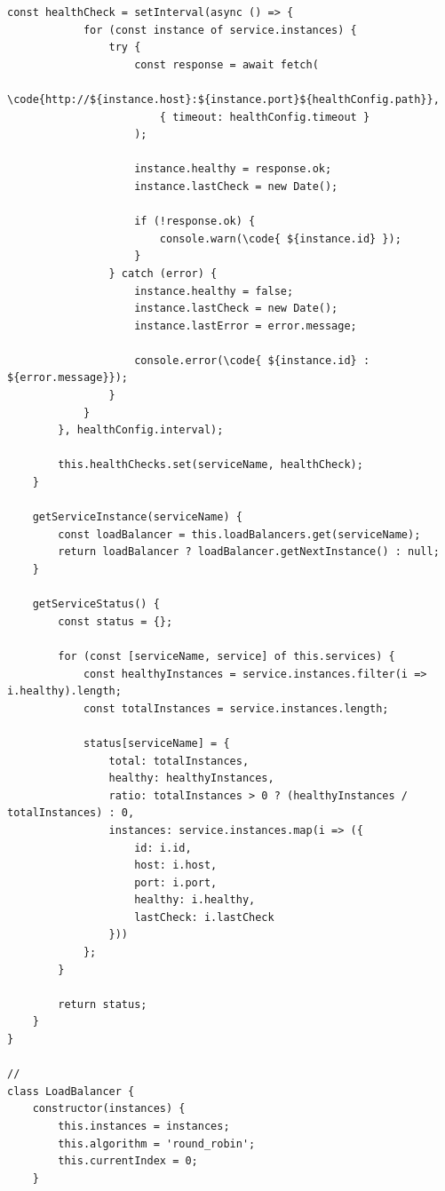 \begin{lstlisting}[style=javascript]
        const healthCheck = setInterval(async () => {
            for (const instance of service.instances) {
                try {
                    const response = await fetch(
                        \code{http://${instance.host}:${instance.port}${healthConfig.path}},
                        { timeout: healthConfig.timeout }
                    );
                    
                    instance.healthy = response.ok;
                    instance.lastCheck = new Date();
                    
                    if (!response.ok) {
                        console.warn(\code{ ${instance.id} });
                    }
                } catch (error) {
                    instance.healthy = false;
                    instance.lastCheck = new Date();
                    instance.lastError = error.message;
                    
                    console.error(\code{ ${instance.id} : ${error.message}});
                }
            }
        }, healthConfig.interval);
        
        this.healthChecks.set(serviceName, healthCheck);
    }
    
    getServiceInstance(serviceName) {
        const loadBalancer = this.loadBalancers.get(serviceName);
        return loadBalancer ? loadBalancer.getNextInstance() : null;
    }
    
    getServiceStatus() {
        const status = {};
        
        for (const [serviceName, service] of this.services) {
            const healthyInstances = service.instances.filter(i => i.healthy).length;
            const totalInstances = service.instances.length;
            
            status[serviceName] = {
                total: totalInstances,
                healthy: healthyInstances,
                ratio: totalInstances > 0 ? (healthyInstances / totalInstances) : 0,
                instances: service.instances.map(i => ({
                    id: i.id,
                    host: i.host,
                    port: i.port,
                    healthy: i.healthy,
                    lastCheck: i.lastCheck
                }))
            };
        }
        
        return status;
    }
}

// 
class LoadBalancer {
    constructor(instances) {
        this.instances = instances;
        this.algorithm = 'round_robin';
        this.currentIndex = 0;
    }
    

\end{lstlisting}
